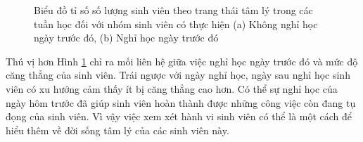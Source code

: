 \begin{figure}[!ht]
\caption{Biểu đồ tỉ số số lượng sinh viên theo trang thái tâm lý trong các tuần học đối với nhóm sinh viên có thực hiện (a) Không nghỉ học ngày trước đó, (b) Nghỉ học ngày trước đó}
\label{feat_skip}
\end{figure}

Thú vị hơn Hình \ref{feat_skip} chỉ ra mối liên hệ giữa việc nghỉ học ngày trước đó và mức độ căng thẳng của sinh viên. Trái ngược với ngày nghỉ học, ngày sau nghỉ học sinh viên có xu hướng cảm thấy ít bị căng thẳng cao hơn. Có thể sự nghỉ học của ngày hôm trước đã giúp sinh viên hoàn thành được những công việc còn đang tụ đọng của sinh viên. Vì vậy việc xem xét hành vi sinh viên có thể là một cách để hiểu thêm về đời sống tâm lý của các sinh viên này.

